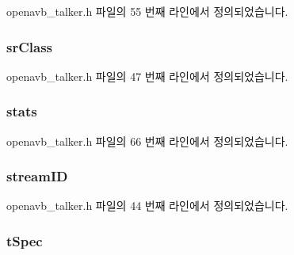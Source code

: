 openavb\+\_\+talker.\+h 파일의 55 번째 라인에서 정의되었습니다.

\subsubsection[{\texorpdfstring{sr\+Class}{srClass}}]{ sr\+Class}\hypertarget{structtalker__data__t_a0ce524f0210a76139ed0aa1ae3ff24f4}{}\label{structtalker__data__t_a0ce524f0210a76139ed0aa1ae3ff24f4}


openavb\+\_\+talker.\+h 파일의 47 번째 라인에서 정의되었습니다.

\subsubsection[{\texorpdfstring{stats}{stats}}]{ stats}\hypertarget{structtalker__data__t_ad690691ca7f6f435d5ade9ccfcaa211d}{}\label{structtalker__data__t_ad690691ca7f6f435d5ade9ccfcaa211d}


openavb\+\_\+talker.\+h 파일의 66 번째 라인에서 정의되었습니다.

\subsubsection[{\texorpdfstring{stream\+ID}{streamID}}]{ stream\+ID}\hypertarget{structtalker__data__t_a989c1ccd88811e9926203a07d587bc21}{}\label{structtalker__data__t_a989c1ccd88811e9926203a07d587bc21}


openavb\+\_\+talker.\+h 파일의 44 번째 라인에서 정의되었습니다.

\subsubsection[{\texorpdfstring{t\+Spec}{tSpec}}]{ t\+Spec}\hypertarget{structtalker__data__t_ab928eca0e7b010a8cc3a80be5bc8adcc}{}\label{structtalker__data__t_ab928eca0e7b010a8cc3a80be5bc8adcc}


